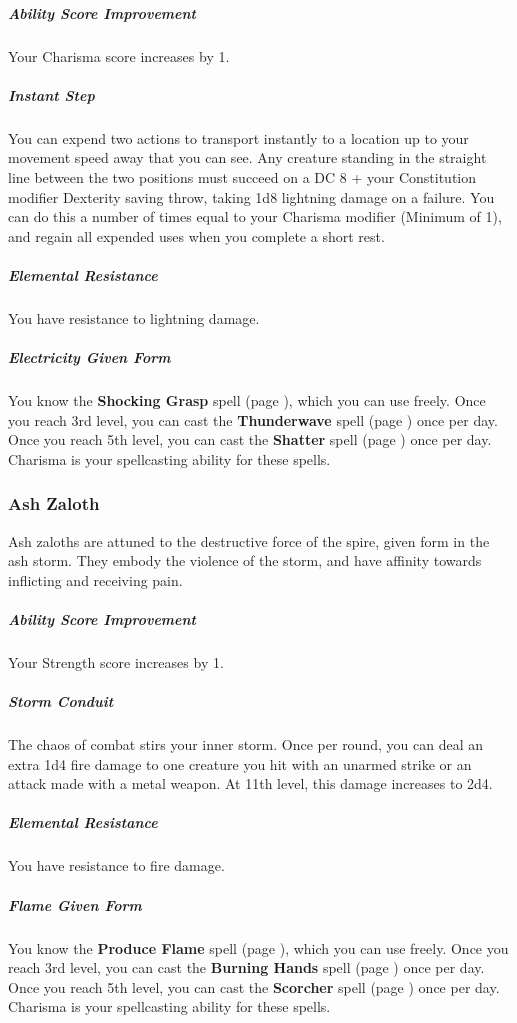     \subparagraph{Ability Score Improvement}
        Your Charisma score increases by 1.

    \subparagraph{Instant Step}
        You can expend two actions to transport instantly to a location up to your movement speed away that you can see.
        Any creature standing in the straight line between the two positions must succeed on a DC 8 + your Constitution modifier Dexterity saving throw, taking 1d8 lightning damage on a failure.
        You can do this a number of times equal to your Charisma modifier (Minimum of 1), and regain all expended uses when you complete a short rest.

    \subparagraph{Elemental Resistance}
        You have resistance to lightning damage.

    \subparagraph{Electricity Given Form}
        You know the \textbf{Shocking Grasp} spell (page \pageref{spell::shockinggrasp}), which you can use freely.
        Once you reach 3rd level, you can cast the \textbf{Thunderwave} spell (page \pageref{spell::thunderwave}) once per day.
        Once you reach 5th level, you can cast the \textbf{Shatter} spell (page \pageref{spell::shatter}) once per day.
        Charisma is your spellcasting ability for these spells.

\subsubsection{Ash Zaloth}
    Ash zaloths are attuned to the destructive force of the spire, given form in the ash storm.
    They embody the violence of the storm, and have affinity towards inflicting and receiving pain.

    \subparagraph{Ability Score Improvement}
        Your Strength score increases by 1.

    \subparagraph{Storm Conduit}
        The chaos of combat stirs your inner storm.
        Once per round, you can deal an extra 1d4 fire damage to one creature you hit with an unarmed strike or an attack made with a metal weapon.
        At 11th level, this damage increases to 2d4.

    \subparagraph{Elemental Resistance}
        You have resistance to fire damage.

    \subparagraph{Flame Given Form}
        You know the \textbf{Produce Flame} spell (page \pageref{spell::produceflame}), which you can use freely.
        Once you reach 3rd level, you can cast the \textbf{Burning Hands} spell (page \pageref{spell::burninghands}) once per day.
        Once you reach 5th level, you can cast the \textbf{Scorcher} spell (page \pageref{spell::scorcher}) once per day.
        Charisma is your spellcasting ability for these spells.

